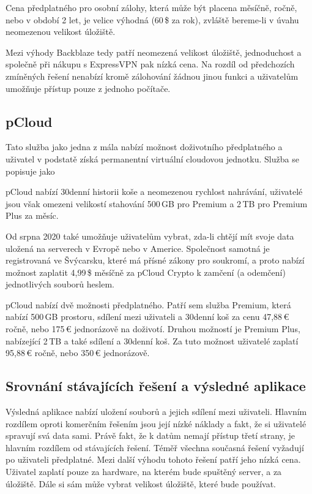 \documentclass[
  glossaries,
]{kidiplom}
\begin{document}
Cena předplatného pro osobní zálohy, která může být placena měsíčně, ročně, nebo v období 2 let, je velice výhodná (60\,\$ za rok), zvláště bereme-li v úvahu neomezenou velikost úložiště.

Mezi výhody Backblaze tedy patří neomezená velikost úložiště, jednoduchost a společně při nákupu s ExpressVPN pak nízká cena. Na rozdíl od předchozích zmíněných řešení nenabízí kromě zálohování žádnou jinou funkci a uživatelům umožňuje přístup pouze z jednoho počítače.

\subsection{pCloud}
Tato služba jako jedna z mála nabízí možnost doživotního předplatného a uživatel v podstatě získá permanentní virtuální cloudovou jednotku. Služba se popisuje jako 


pCloud nabízí 30denní historii koše a neomezenou rychlost nahrávání, uživatelé jsou však omezeni velikostí stahování 500\,GB pro Premium a 2\,TB pro Premium Plus za měsíc.

Od srpna 2020 také umožňuje uživatelům vybrat, zda-li chtějí mít svoje data uložená na serverech v Evropě nebo v Americe. Společnost samotná je registrovaná ve Švýcarsku, které má přísné zákony pro soukromí, a proto nabízí možnost zaplatit 4,99\,\$ měsíčně za pCloud Crypto k zamčení (a odemčení) jednotlivých souborů heslem.

pCloud nabízí dvě možnosti předplatného. Patří sem služba Premium, která nabízí 500\,GB prostoru, sdílení mezi uživateli a 30denní koš za cenu 47,88\,€ ročně, nebo 175\,€ jednorázově na doživotí. Druhou možností je Premium Plus, nabízející 2\,TB a také sdílení a 30denní koš. Za tuto možnost uživatelé zaplatí 95,88\,€ ročně, nebo 350\,€ jednorázově. \cite{PCLOUD}

\subsection{Srovnání stávajících řešení a výsledné aplikace}
Výsledná aplikace nabízí uložení souborů a jejich sdílení mezi uživateli. Hlavním rozdílem oproti komerčním řešením jsou její nízké náklady a fakt, že si uživatelé spravují svá data sami. Právě fakt, že k datům nemají přístup třetí strany, je hlavním rozdílem od stávajících řešení.
Téměř všechna současná řešení vyžadují po uživateli předplatné. Mezi další výhodu tohoto řešení patří jeho nízká cena. Uživatel zaplatí pouze za hardware, na kterém bude spuštěný server, a za úložiště. Dále si sám může vybrat velikost úložiště, které bude používat.
\end{document}
